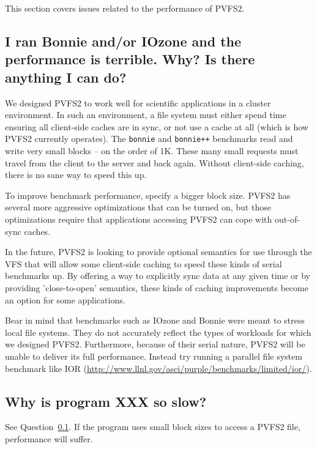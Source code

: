 \documentclass[11pt,letterpaper]{article}
\begin{document}
This section covers issues related to the performance of PVFS2.

\subsection{I ran Bonnie and/or IOzone and the performance is terrible.
Why? Is there anything I can do?}
\label{sec:badperf}

We designed PVFS2 to work well for scientific applications in a cluster
environment.  In such an environment, a file system must either spend
time ensuring all client-side caches are in sync, or not use a cache
at all (which is how PVFS2 currently operates).  The \texttt{bonnie}
and \texttt{bonnie++} benchmarks read and write very small blocks --
on the order of 1K.  These many small requests must travel from the
client to the server and back again.  Without client-side caching,
there is no sane way to speed this up.

To improve benchmark performance, specify a bigger block size.   PVFS2
has several more aggressive optimizations that can be turned on, but
those optimizations require that applications accessing PVFS2 can cope
with out-of-sync caches.  

In the future, PVFS2 is looking to provide optional semantics for use
through the VFS that will allow some client-side caching to speed these
kinds of serial benchmarks up.  By offering a way to explicitly sync
data at any given time or by providing 'close-to-open' semantics, these
kinds of caching improvements become an option for some applications.

Bear in mind that benchmarks such as IOzone and Bonnie were meant to
stress local file systems.   They do not accurately reflect the types of
workloads for which we designed PVFS2.  Furthermore, because of their
serial nature, PVFS2 will be unable to deliver its full performance.
Instead try running a parallel file system benchmark like IOR
(\url{http://www.llnl.gov/asci/purple/benchmarks/limited/ior/}).


\subsection{Why is program XXX so slow?}
\label{sec:why_so_slow}
See Question~\ref{sec:badperf}.  If the program uses small block sizes to
access a PVFS2 file, performance will suffer.  
\end{document}
